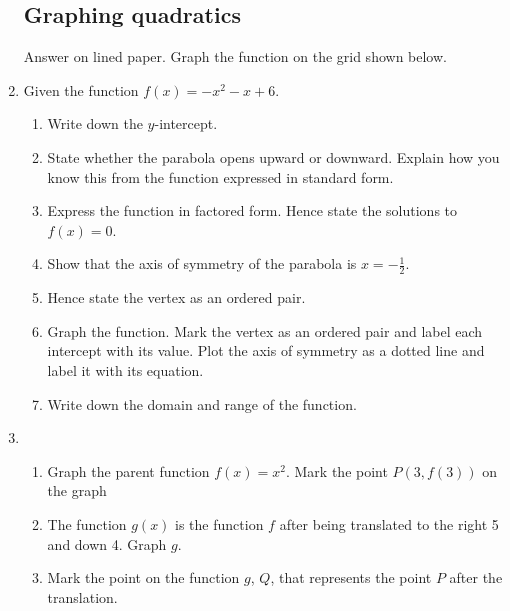 \documentclass[12pt, twoside]{article}
\begin{document}
\begin{enumerate}
    \subsection*{Graphing quadratics}
    Answer on lined paper. Graph the function on the grid shown below.
    \item Given the function $f(x)=-x^2-x+6$. 
    \begin{enumerate}
        \item Write down the $y$-intercept.
        \item State whether the parabola opens upward or downward. Explain how you know this from the function expressed in standard form.
        \item Express the function in factored form. Hence state the solutions to $f(x)=0$.
        \item Show that the axis of symmetry of the parabola is $x=-\frac{1}{2}$.
        \item Hence state the vertex as an ordered pair. 
        \item Graph the function. Mark the vertex as an ordered pair and label each intercept with its value. Plot the axis of symmetry as a dotted line and label it with its equation.
        \item Write down the domain and range of the function.
    \end{enumerate}
    
    \begin{center}
      \end{center}
          
    \newpage
    \item  
    \begin{enumerate}
        \item Graph the parent function $f(x)=x^2$. Mark the point $P(3, f(3))$ on the graph
        \item The function $g(x)$ is the function $f$ after being translated to the right 5 and down 4. Graph $g$.
        \item Mark the point on the function $g$, $Q$, that represents the point $P$ after the translation.
    \end{enumerate}
    

\end{enumerate}
\end{document}
